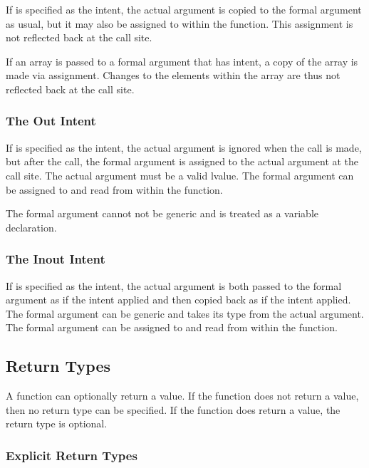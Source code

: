 If  is specified as the intent, the actual argument is copied
to the formal argument as usual, but it may also be assigned to within
the function.  This assignment is not reflected back at the call site.

If an array is passed to a formal argument that has  intent,
a copy of the array is made via assignment.  Changes to the elements
within the array are thus not reflected back at the call site.

\subsubsection{The Out Intent}
\label{The_Out_Intent}

If  is specified as the intent, the actual argument is
ignored when the call is made, but after the call, the formal argument
is assigned to the actual argument at the call site.  The actual
argument must be a valid lvalue.  The formal argument can be assigned
to and read from within the function.

The formal argument cannot not be generic and is treated as a variable
declaration.

\subsubsection{The Inout Intent}
\label{The_Inout_Intent}

If  is specified as the intent, the actual argument is
both passed to the formal argument as if the  intent applied
and then copied back as if the  intent applied.  The formal
argument can be generic and takes its type from the actual argument.
The formal argument can be assigned to and read from within the
function.

\subsection{Return Types}
\label{Return_Types}

A function can optionally return a value.  If the function does not
return a value, then no return type can be specified.  If the function
does return a value, the return type is optional.

\subsubsection{Explicit Return Types}
\label{Explicit_Return_Types}

